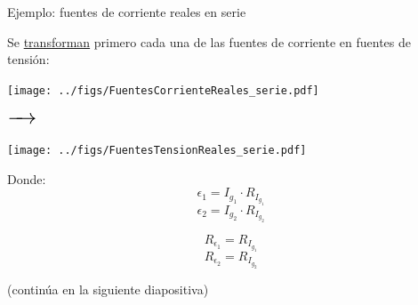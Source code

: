 \documentclass[aspectratio=169, xcolor={usenames,svgnames,dvipsnames}]{beamer}
\begin{document}
\begin{frame}{Ejemplo: \hspace{3mm}fuentes de corriente reales en serie}

    \vspace{2mm}
    Se \hyperlink{diapo:transformacion_fuentes}{transforman} primero cada una de las fuentes de corriente en fuentes de tensión:

    \vspace{1mm}
    \begin{minipage}[c]{0.05\linewidth}
        \hfill
    \end{minipage}
    \begin{minipage}[c]{0.15\linewidth}
        \begin{center}
        \texttt{[image: ../figs/FuentesCorrienteReales\_serie.pdf]}
        \end{center}
    \end{minipage}
    \begin{minipage}[c]{0.08\linewidth}
        \begin{center}
        $\LARGE \xrightarrow{\hspace*{0.5cm}}$ %
        \end{center}
    \end{minipage}
    \begin{minipage}[c]{0.15\linewidth}
        \begin{center}
        \texttt{[image: ../figs/FuentesTensionReales\_serie.pdf]}
        \end{center}
    \end{minipage}
    \begin{minipage}[c]{0.05\linewidth}
        \hfill
    \end{minipage}
    \begin{minipage}[c]{0.45\linewidth}
        Donde:
        \[
          \epsilon_1 = I_{g_1} \cdot R_{I_{g_1}}
        \]  
        \[
          \epsilon_2 = I_{g_2} \cdot R_{I_{g_2}}
        \] 
          
        \[
          R_{\epsilon_1} = R_{I_{g_1}}
        \]
        \[
          R_{\epsilon_2} = R_{I_{g_2}}
        \]

        \vspace{6mm}
        \centering \small{(continúa en la siguiente diapositiva)}
    \end{minipage}
\end{frame}
\end{document}
